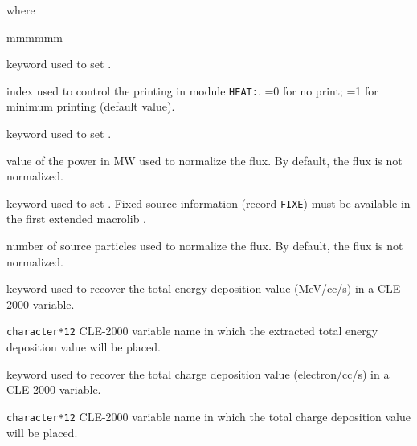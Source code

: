 \noindent where
\begin{ListeDeDescription}{mmmmmm}

\item[\moc{EDIT}] keyword used to set .

\item[\dusa{iprint}] index used to control the printing in module {\tt HEAT:}. =0 for no print; =1 for minimum printing (default value).

\item[\moc{POWR}] keyword used to set .

\item[\dusa{power}] value of the power in MW used to normalize the flux. By default, the flux is not normalized.

\item[\moc{SOUR}] keyword used to set . Fixed source information (record {\tt FIXE}) must be available in the first extended macrolib .

\item[\dusa{snumb}] number of source particles used to normalize the flux. By default, the flux is not normalized.

\item[\moc{PICKE}]  keyword used to recover the total energy deposition value (MeV/cc/s) in a CLE-2000 variable.

\item[\dusa{esum}] \texttt{character*12} CLE-2000 variable name in which the extracted total energy deposition value will be placed.

\item[\moc{PICKC}]  keyword used to recover the total charge deposition value (electron/cc/s) in a CLE-2000 variable.

\item[\dusa{csum}] \texttt{character*12} CLE-2000 variable name in which the total charge deposition value will be placed.

\end{ListeDeDescription}
\clearpage
